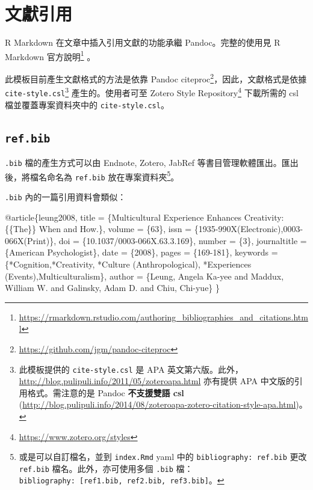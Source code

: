 \documentclass[oneside]{book}
\newenvironment{Shaded}{\begin{snugshade}}{\end{snugshade}}
\newcommand{\DataTypeTok}[1]{\textcolor[rgb]{0.13,0.29,0.53}{#1}}
\newcommand{\NormalTok}[1]{#1}
\newcommand{\OtherTok}[1]{\textcolor[rgb]{0.56,0.35,0.01}{#1}}
\newcommand{\VariableTok}[1]{\textcolor[rgb]{0.00,0.00,0.00}{#1}}
\renewcommand{\href}[2]{#2\footnote{\url{#1}}}
\begin{document}
\hypertarget{bib-cite}{%
\section{文獻引用}\label{bib-cite}}

R Markdown 在文章中插入引用文獻的功能承繼 Pandoc。完整的使用見 \href{https://rmarkdown.rstudio.com/authoring_bibliographies_and_citations.html}{R Markdown 官方說明} 。

此模板目前產生文獻格式的方法是依靠 \href{https://github.com/jgm/pandoc-citeproc}{Pandoc citeproc}，因此，文獻格式是依據 \texttt{cite-style.csl}\footnote{此模板提供的 \texttt{cite-style.csl} 是 APA 英文第六版。此外，\url{http://blog.pulipuli.info/2011/05/zoteroapa.html} 亦有提供 APA 中文版的引用格式。需注意的是 Pandoc \textbf{不支援雙語 csl} (\url{http://blog.pulipuli.info/2014/08/zoteroapa-zotero-citation-style-apa.html})。} 產生的。使用者可至 \href{https://www.zotero.org/styles}{Zotero Style Repository} 下載所需的 csl 檔並覆蓋專案資料夾中的 \texttt{cite-style.csl}。

\hypertarget{ref-bib}{%
\subsection{\texorpdfstring{\texttt{ref.bib}}{ref.bib}}\label{ref-bib}}

\texttt{.bib} 檔的產生方式可以由 Endnote, Zotero, JabRef 等書目管理軟體匯出。匯出後，將檔名命名為 \texttt{ref.bib} 放在專案資料夾\footnote{或是可以自訂檔名，並到 \texttt{index.Rmd} yaml 中的 \texttt{bibliography:\ ref.bib} 更改 \texttt{ref.bib} 檔名。此外，亦可使用多個 \texttt{.bib} 檔：\texttt{bibliography:\ {[}ref1.bib,\ ref2.bib,\ ref3.bib{]}}。}。

\texttt{.bib} 內的一篇引用資料會類似：

\begin{Shaded}
\begin{Highlighting}[]
\VariableTok{@article}\NormalTok{\{}\OtherTok{leung2008}\NormalTok{,}
  \DataTypeTok{title}\NormalTok{ = \{Multicultural Experience Enhances Creativity: \{\{The\}\} When and How.\},}
  \DataTypeTok{volume}\NormalTok{ = \{63\},}
  \DataTypeTok{issn}\NormalTok{ = \{1935-990X(Electronic),0003-066X(Print)\},}
  \DataTypeTok{doi}\NormalTok{ = \{10.1037/0003-066X.63.3.169\},}
  \DataTypeTok{number}\NormalTok{ = \{3\},}
  \DataTypeTok{journaltitle}\NormalTok{ = \{American Psychologist\},}
  \DataTypeTok{date}\NormalTok{ = \{2008\},}
  \DataTypeTok{pages}\NormalTok{ = \{169-181\},}
  \DataTypeTok{keywords}\NormalTok{ = \{*Cognition,*Creativity,}
\NormalTok{    *Culture (Anthropological),}
\NormalTok{    *Experiences (Events),Multiculturalism\},}
  \DataTypeTok{author}\NormalTok{ = \{Leung, Angela Ka-yee and }
\NormalTok{    Maddux, William W. and }
\NormalTok{    Galinsky, Adam D. and Chiu, Chi-yue\}}
\NormalTok{\}}
\end{Highlighting}
\end{Shaded}
\end{document}
